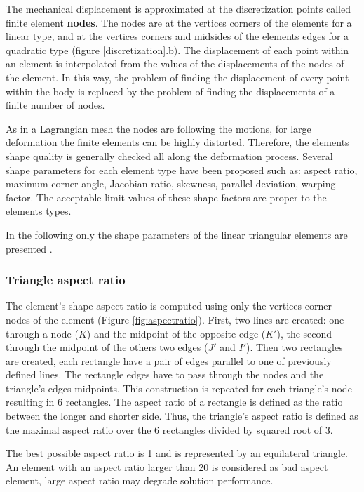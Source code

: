  The mechanical displacement is approximated at the discretization points called finite element\textbf{ nodes}. The nodes are at the vertices corners of the elements for a linear type, and at the vertices corners and midsides of the elements edges for a quadratic type (figure \ref{discretization}.b). The displacement of each point within an element is interpolated from the values of the displacements of the nodes of the element. In this way, the problem of finding the displacement of every point within the body is replaced by the problem of finding the displacements of a finite number of nodes.
 
 As in a Lagrangian mesh the nodes are following the motions, for large deformation the finite elements can be highly distorted. Therefore, the elements shape quality is generally checked all along the deformation process. Several shape parameters for each element type have been proposed such as: aspect ratio, maximum corner angle, Jacobian ratio, skewness, parallel deviation, warping factor. The acceptable limit values of these shape factors are proper to the elements types. 
 
In the following only the shape parameters of the linear triangular elements are presented \citep{ansys_theory_2009}.  
 \subsubsection*{Triangle aspect ratio }
 The element's shape aspect ratio is computed using only the vertices corner nodes of the element (Figure \ref{fig:aspectratio}). First, two lines are created: one through a node ($K$) and the midpoint of the opposite edge ($ K'$), the second through the midpoint of the others two edges ($J'$ and $ I'$). Then two rectangles are created, each rectangle have a pair of edges parallel to one of previously defined lines. The rectangle edges have to pass through the nodes and the triangle's edges midpoints. This construction is repeated for each triangle's node resulting in 6 rectangles. The aspect ratio of a rectangle is defined as the ratio between the longer and shorter side. Thus, the triangle's aspect ratio is defined as the maximal aspect ratio over the 6 rectangles divided by squared root of 3. 
 
 The best possible aspect ratio is 1 and is represented by an equilateral triangle. An element with an aspect ratio larger than 20 is considered as bad aspect element, large aspect ratio may degrade solution performance.
 
